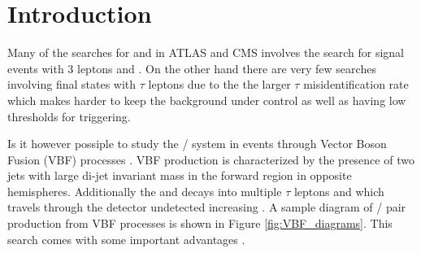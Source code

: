 \section {Introduction}

Many of the searches for \charginopm and \neutralinotwo in ATLAS \cite{Aad:2012hba, ATLAS:2012ab} and CMS \cite{Chatrchyan:2012mea} involves the search for signal events with 3 leptons and \met. On the other hand there are very few searches involving final states with $\tau$ leptons due to the the larger $\tau$ misidentification rate which makes harder to keep the background under control as well as having low \pt thresholds for triggering.

Is it however possiple to study the \charginopm / \neutralinotwo system in events through Vector Boson Fusion (VBF) processes \cite{Bjorken:1992er}. VBF production is characterized by the presence of two jets with large di-jet invariant mass in the forward region in opposite hemispheres. Additionally the \charginopm and \neutralinotwo decays into multiple $\tau$ leptons and \neutralinoone which travels through the detector undetected increasing \met. A sample diagram of \charginopm / \neutralinotwo pair production from VBF processes is shown in Figure \ref{fig:VBF_diagrams}. This search comes with some important advantages \cite{Dutta:2012xe}.

